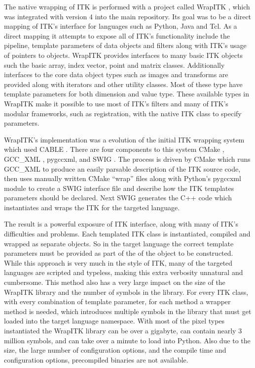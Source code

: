 \documentclass{frontiersMED} %
\begin{document}
The native wrapping of ITK is performed with a project called WrapITK
\cite{Lehmann2006}, which was integrated with version 4 into the main
repository. Its goal was to be a direct mapping of ITK’s interface for
languages such as Python, Java and Tcl. As a direct mapping it
attempts to expose all of ITK’s functionality include the pipeline,
template parameters of data objects and filters along with ITK’s usage
of pointers to objects. WrapITK provides interfaces to many basic ITK
objects such the basic array, index vector, point and matrix
classes. Additionally interfaces to the core data object types such as
images and transforms are provided along with iterators and other
utility classes. Most of these type have template parameters for both
dimension and value type. These available types in WrapITK make it
possible to use most of ITK’s filters and many of ITK’s modular
frameworks, such as registration, with the native ITK class to specify
parameters.

WrapITK’s implementation was a evolution of the initial ITK wrapping
system which used CABLE \cite{Lehmann2006}. There are four components to
this system CMake \cite{Martin2003}, GCC\_XML \cite{gccxml}, pygccxml, and SWIG
\cite{Beazley2003}. The process is driven by CMake which runs GCC\_XML to
produce an easily parsable description of the ITK source code, then
uses manually written CMake “wrap” files along with Python’s pygccxml
module to create a SWIG interface file and describe how the ITK
templates parameters should be declared. Next SWIG generates the C++
code which instantiates and wraps the ITK for the targeted language.

The result is a powerful exposure of ITK interface, along with many of
ITK’s difficulties and problems. Each templated ITK class is
instantiated, compiled and wrapped as separate objects. So in the
target language the correct template parameters must be provided as
part of the of the object to be constructed. While this approach is
very much in the style of ITK, many of the targeted languages are
scripted and typeless, making this extra verbosity unnatural and
cumbersome.  This method also has a very large impact on the size of
the WrapITK library and the number of symbols in the library. For
every ITK class, with every combination of template parameter, for
each method a wrapper method is needed, which introduces multiple
symbols in the library that must get loaded into the target language
namespace. With most of the pixel types instantiated the WrapITK
library can be over a gigabyte, can contain nearly 3 million symbols,
and can take over a minute to load into Python. Also due to the size,
the large number of configuration options, and the compile time and
configuration options, precompiled binaries are not available.
\end{document}
